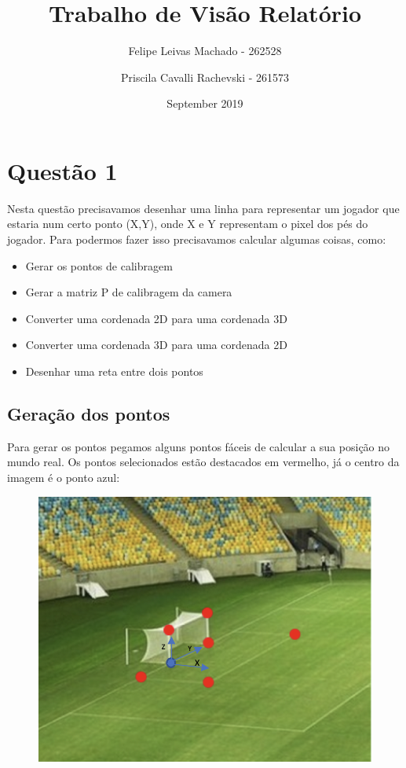 \documentclass{article}
\title{Trabalho de Visão Relatório}
\author{Felipe Leivas Machado - 262528 \and Priscila Cavalli Rachevski - 261573 }
\date{September 2019}
\begin{document}
\maketitle

\section{Questão 1}
    Nesta questão precisavamos desenhar uma linha para representar um jogador que estaria num certo ponto (X,Y), onde X e Y representam o pixel dos pés do jogador. Para podermos fazer isso precisavamos calcular algumas coisas, como:
   \begin{itemize}
       \item Gerar os pontos de calibragem
       \item Gerar a matriz P de calibragem da camera
       \item Converter uma cordenada 2D para uma cordenada 3D
       \item Converter uma cordenada 3D  para uma cordenada 2D
       \item Desenhar uma reta entre dois pontos
   \end{itemize}

    \subsection{Geração dos pontos}
        Para gerar os pontos pegamos alguns pontos fáceis de calcular a sua posição no mundo real. Os pontos selecionados estão destacados em vermelho, já o centro da imagem é o ponto azul:

        \begin{figure}[h!]
        \includegraphics[scale=0.4]{maracana1Pontos.png}
        \end{figure}
\end{document}
